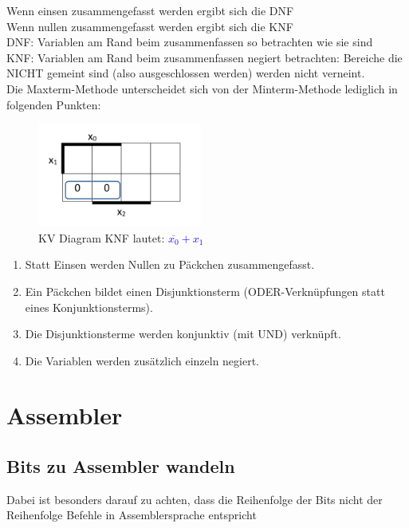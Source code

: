 \documentclass[a4paper]{article}
\begin{document}
		Wenn einsen zusammengefasst werden ergibt sich die DNF\\
		Wenn nullen zusammengefasst werden ergibt sich die KNF\\
		DNF: Variablen am Rand beim zusammenfassen so betrachten wie sie sind\\
		KNF: Variablen am Rand beim zusammenfassen negiert betrachten: Bereiche die NICHT gemeint sind (also ausgeschlossen werden) werden nicht verneint.\\
		Die Maxterm-Methode unterscheidet sich von der Minterm-Methode lediglich in folgenden Punkten:
		\begin{figure}
			\vspace{-20pt}
			\begin{center}
				\includegraphics[width=0.48\textwidth]{kv-KNF.png}
			\end{center}
			\vspace{-20pt}
			\caption{KV Diagram KNF lautet: \textcolor{blue}{$\overline{x_0}+x_1$}}
			\vspace{-20pt}
		\end{figure}

		\begin{enumerate}
			\item Statt Einsen werden Nullen zu Päckchen zusammengefasst.
			\item Ein Päckchen bildet einen Disjunktionsterm (ODER-Verknüpfungen statt eines Konjunktionsterms).
			\item Die Disjunktionsterme werden konjunktiv (mit UND) verknüpft.
			\item Die Variablen werden zusätzlich einzeln negiert.
		\end{enumerate}

\section{Assembler}
	\subsection{Bits zu Assembler wandeln}
		Dabei ist besonders darauf zu achten, dass die Reihenfolge der Bits nicht der Reihenfolge Befehle in Assemblersprache entspricht
\end{document}
